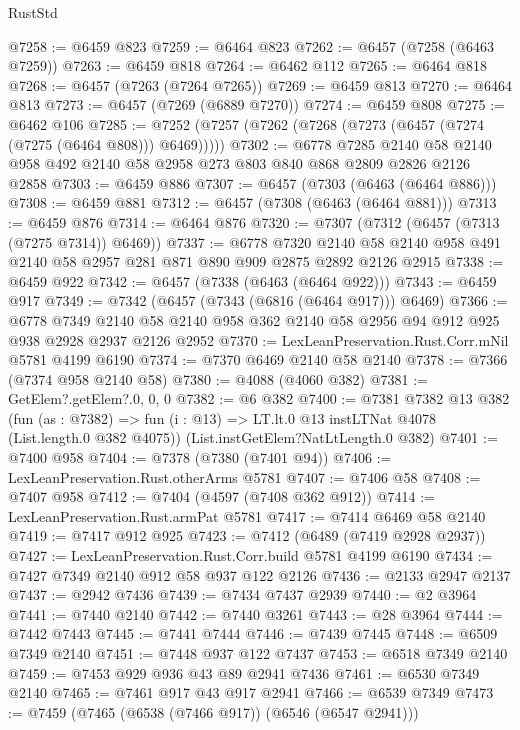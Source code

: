 \begin{lexlean}{RustStd}
\begin{coremodule}
@7258 := @6459 @823
@7259 := @6464 @823
@7262 := @6457 (@7258 (@6463 @7259))
@7263 := @6459 @818
@7264 := @6462 @112
@7265 := @6464 @818
@7268 := @6457 (@7263 (@7264 @7265))
@7269 := @6459 @813
@7270 := @6464 @813
@7273 := @6457 (@7269 (@6889 @7270))
@7274 := @6459 @808
@7275 := @6462 @106
@7285 := @7252 (@7257 (@7262 (@7268 (@7273 (@6457 (@7274 (@7275 (@6464 @808))) @6469)))))
@7302 := @6778
    @7285
    @2140
    @58
    @2140
    @958
    @492
    @2140
    @58
    @2958
    @273
    @803
    @840
    @868
    @2809
    @2826
    @2126
    @2858
@7303 := @6459 @886
@7307 := @6457 (@7303 (@6463 (@6464 @886)))
@7308 := @6459 @881
@7312 := @6457 (@7308 (@6463 (@6464 @881)))
@7313 := @6459 @876
@7314 := @6464 @876
@7320 := @7307 (@7312 (@6457 (@7313 (@7275 @7314)) @6469))
@7337 := @6778
    @7320
    @2140
    @58
    @2140
    @958
    @491
    @2140
    @58
    @2957
    @281
    @871
    @890
    @909
    @2875
    @2892
    @2126
    @2915
@7338 := @6459 @922
@7342 := @6457 (@7338 (@6463 (@6464 @922)))
@7343 := @6459 @917
@7349 := @7342 (@6457 (@7343 (@6816 (@6464 @917))) @6469)
@7366 := @6778
    @7349
    @2140
    @58
    @2140
    @958
    @362
    @2140
    @58
    @2956
    @94
    @912
    @925
    @938
    @2928
    @2937
    @2126
    @2952
@7370 := LexLeanPreservation.Rust.Corr.mNil @5781 @4199 @6190
@7374 := @7370 @6469 @2140 @58 @2140
@7378 := @7366 (@7374 @958 @2140 @58)
@7380 := @4088 (@4060 @382)
@7381 := GetElem?.getElem?.{0, 0, 0}
@7382 := @6 @382
@7400 := @7381
    @7382
    @13
    @382
    (fun (as : @7382) =>
    fun (i : @13) => LT.lt.{0} @13 instLTNat @4078 (List.length.{0} @382 @4075))
    (List.instGetElem?NatLtLength.{0} @382)
@7401 := @7400 @958
@7404 := @7378 (@7380 (@7401 @94))
@7406 := LexLeanPreservation.Rust.otherArms @5781
@7407 := @7406 @58
@7408 := @7407 @958
@7412 := @7404 (@4597 (@7408 @362 @912))
@7414 := LexLeanPreservation.Rust.armPat @5781
@7417 := @7414 @6469 @58 @2140
@7419 := @7417 @912 @925
@7423 := @7412 (@6489 (@7419 @2928 @2937))
@7427 := LexLeanPreservation.Rust.Corr.build @5781 @4199 @6190
@7434 := @7427 @7349 @2140 @912 @58 @937 @122 @2126
@7436 := @2133 @2947 @2137
@7437 := @2942 @7436
@7439 := @7434 @7437 @2939
@7440 := @2 @3964
@7441 := @7440 @2140
@7442 := @7440 @3261
@7443 := @28 @3964
@7444 := @7442 @7443
@7445 := @7441 @7444
@7446 := @7439 @7445
@7448 := @6509 @7349 @2140
@7451 := @7448 @937 @122 @7437
@7453 := @6518 @7349 @2140
@7459 := @7453 @929 @936 @43 @89 @2941 @7436
@7461 := @6530 @7349 @2140
@7465 := @7461 @917 @43 @917 @2941
@7466 := @6539 @7349
@7473 := @7459 (@7465 (@6538 (@7466 @917)) (@6546 (@6547 @2941)))

\end{coremodule}
\end{lexlean}
